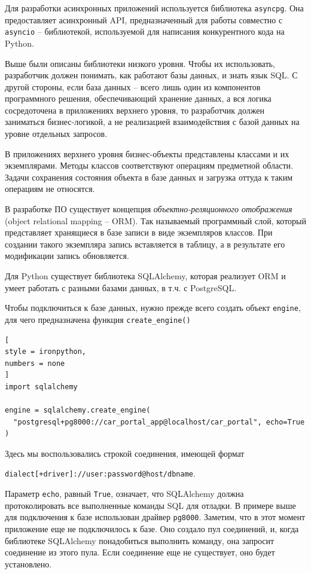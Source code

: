 \documentclass[%
	11pt,
	a4paper,
	utf8,
		]{article}
\begin{document}
Для разработки асинхронных приложений используется библиотека \texttt{asyncpg}. Она предоставляет асинхронный API, предназначенный для работы совместно с \texttt{asyncio} -- библиотекой, используемой для написания конкурентного кода на Python.

Выше были описаны библиотеки низкого уровня. Чтобы их использовать, разработчик должен понимать, как работают базы данных, и знать язык SQL. С другой стороны, если база данных -- всего лишь один из компонентов программного решения, обеспечивающий хранение данных, а вся логика сосредоточена в приложениях верхнего уровня, то разработчик должен заниматься бизнес-логикой, а не реализацией взаимодействия с базой данных на уровне отдельных запросов.

В приложениях верхнего уровня бизнес-объекты представлены классами и их экземплярами. Методы классов соответствуют операциям предметной области. Задачи сохранения состояния объекта в базе данных и загрузка оттуда к таким операциям не относятся.

В разработке ПО существует концепция \emph{объектно-реляционного отображения} (object relational mapping -- ORM). Так называемый программный слой, который представляет хранящиеся в базе записи в виде экземпляров классов. При создании такого экземпляра запись вставляется в таблицу, а в результате его модификации запись обновляется.

Для Python существует библиотека SQLAlchemy, которая реализует ORM и умеет работать с разными базами данных, в т.ч. с PostgreSQL.

Чтобы подключиться к базе данных, нужно прежде всего создать объект \texttt{engine}, для чего предназначена функция \verb|create_engine()|
\begin{lstlisting}[
style = ironpython,
numbers = none
]
import sqlalchemy

engine = sqlalchemy.create_engine(
  "postgresql+pg8000://car_portal_app@localhost/car_portal", echo=True
)
\end{lstlisting}

Здесь мы воспользовались строкой соединения, имеющей формат

\noindent\texttt{dialect[+driver]://user:password@host/dbname}.

Параметр \texttt{echo}, равный \texttt{True}, означает, что SQLAlchemy должна протоколировать все выполненные команды SQL для отладки. В примере выше для подключения к базе использован драйвер \texttt{pg8000}. Заметим, что в этот момент приложение еще не подключилось к базе. Оно создало пул соединений, и, когда библиотеке SQLAlchemy понадобиться выполнить команду, она запросит соединение из этого пула. Если соединение еще не существует, оно будет установлено.
\end{document}
